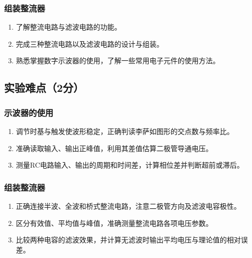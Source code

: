 \documentclass[10pt,a4paper]{ctexart} %
\begin{document}
    \subsubsection{组装整流器}
    \begin{enumerate}
      \item 了解整流电路与滤波电路的功能。
      \item 完成三种整流电路以及滤波电路的设计与组装。
      \item 熟悉掌握数字示波器的使用，了解一些常用电子元件的使用方法。
    \end{enumerate}

  \subsection{实验难点（2分）}

    \subsubsection{示波器的使用}
    \begin{enumerate}
      \item 调节时基与触发使波形稳定，正确判读李萨如图形的交点数与频率比。
      \item 准确读取输入、输出正峰值，利用其差值估算二极管导通电压。
      \item 测量RC电路输入、输出的周期和时间差，计算相位差并判断超前或滞后。
    \end{enumerate}

    \subsubsection{组装整流器}
    \begin{enumerate}
      \item 正确连接半波、全波和桥式整流电路，注意二极管方向及滤波电容极性。
      \item 区分有效值、平均值与峰值，准确测量整流电路各项电压参数。
      \item 比较两种电容的滤波效果，并计算无滤波时输出平均电压与理论值的相对误差。
    \end{enumerate}
\end{document}
